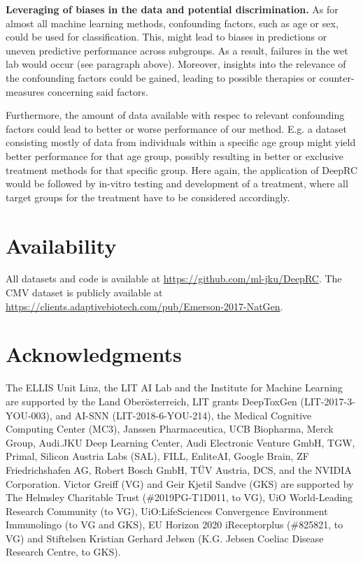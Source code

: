 \documentclass[oneside]{book}
\begin{document}
%
\textbf{Leveraging of biases in the data and potential discrimination.}
As for almost all machine learning methods, confounding factors, such as age or sex, could be used for classification.
This, might lead to biases in predictions or uneven predictive performance
across subgroups. As a result, failures in the wet lab would occur (see paragraph above). Moreover, insights into the relevance of the confounding factors could be gained, leading to possible therapies or counter-measures concerning said factors.

Furthermore, the amount of data available with respec to
relevant confounding factors could lead to better or worse performance 
of our method.
E.g. a dataset consisting mostly of data from individuals within a specific age 
group might yield better performance for that age group,
possibly resulting in better or exclusive treatment methods for that specific 
group.
Here again, the application of DeepRC would be followed by in-vitro testing and 
development of a treatment,
where all target groups for the treatment have to be considered accordingly.


\section*{Availability}
All datasets and code is available at \url{https://github.com/ml-jku/DeepRC}.
The CMV dataset is publicly available at \url{https://clients.adaptivebiotech.com/pub/Emerson-2017-NatGen}.

\section*{Acknowledgments}
The ELLIS Unit Linz, the LIT AI Lab and the 
Institute for Machine Learning are supported by
the Land Oberösterreich,
LIT grants DeepToxGen (LIT-2017-3-YOU-003),
and AI-SNN (LIT-2018-6-YOU-214),	
the Medical Cognitive Computing Center (MC3),
Janssen Pharmaceutica,
UCB Biopharma,
Merck Group,
Audi.JKU Deep Learning Center, Audi Electronic Venture GmbH,
TGW,
Primal,
Silicon Austria Labs (SAL),
FILL,
EnliteAI,
Google Brain,
ZF Friedrichshafen AG,
Robert Bosch GmbH,
TÜV Austria,
DCS,
and the NVIDIA Corporation. 
Victor Greiff (VG) and Geir Kjetil Sandve (GKS) are supported by The Helmsley 
Charitable Trust (\#2019PG-T1D011, to VG), UiO World-Leading Research 
Community (to VG), UiO:LifeSciences Convergence Environment Immunolingo 
(to VG and GKS), EU Horizon 2020 iReceptorplus (\#825821, to VG) and 
Stiftelsen Kristian Gerhard Jebsen (K.G. Jebsen Coeliac Disease Research 
Centre, to GKS). 
\end{document}
